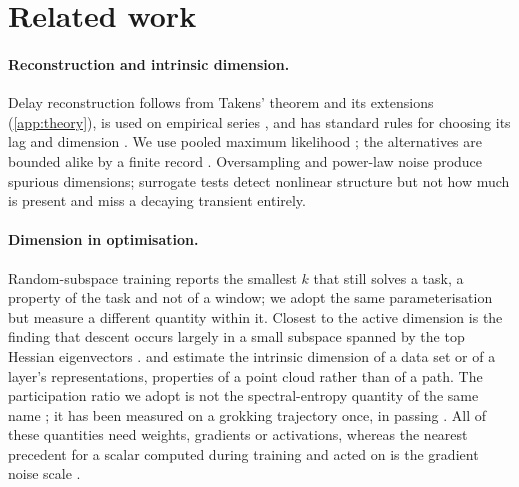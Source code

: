 \documentclass{article}
\begin{document}
\section{Related work}\label{sec:related}

\paragraph{Reconstruction and intrinsic dimension.} Delay reconstruction follows from Takens'
theorem and its extensions (\cref{app:theory}), is used on empirical series \citep{sugihara1990nonlinear,
sugihara2012detecting}, and has standard rules for choosing its lag and dimension
\citep{fraser1986independent, kennel1992determining, cao1997practical,
broomhead1986extracting}. We use pooled maximum likelihood
\citep{levina2004maximum, mackay2005comments}; the alternatives \citep{grassberger1983measuring,
facco2017estimating, camastra2016intrinsic} are bounded alike by a finite record
\citep{eckmann1992fundamental}. Oversampling \citep{theiler1986spurious} and power-law
noise \citep{osborne1989finite} produce spurious dimensions; surrogate tests
\citep{theiler1992testing, schreiber1996improved} detect nonlinear structure but not how much is
present and miss a decaying transient entirely.

\paragraph{Dimension in optimisation.} Random-subspace training \citep{li2018measuring,
aghajanyan2021intrinsic} reports the smallest $k$ that still solves a task, a property of the task
and not of a window; we adopt the same parameterisation but measure a different quantity within it.
Closest to the active dimension is the finding that descent occurs largely in a small subspace
spanned by the top Hessian eigenvectors \citep{gurari2018gradient, sagun2018empirical}.
 and \citet{pope2021intrinsic} estimate the intrinsic dimension of a
data set or of a layer's representations, properties of a point cloud rather than of a path.
The participation ratio we adopt \citep{gao2017theory} is not
the spectral-entropy quantity of the same name \citep{roy2007effective}; it has been measured on a
grokking trajectory once, in passing \citep{notsawo2023predicting}. All of these quantities need
weights, gradients or activations, whereas the nearest precedent for a scalar computed during
training and acted on is the gradient noise scale \citep{mccandlish2018empirical}.
\end{document}
